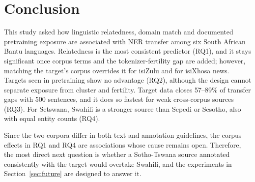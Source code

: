 \section{Conclusion}\label{sec:conclusion}
This study asked how linguistic relatedness, domain match and documented pretraining exposure are associated with NER transfer among six South African Bantu languages. Relatedness is the most consistent predictor (RQ1), and it stays significant once corpus terms and the tokenizer-fertility gap are added; however, matching the target's corpus overrides it for isiZulu and for isiXhosa news. Targets seen in pretraining show no advantage (RQ2), although the design cannot separate exposure from cluster and fertility. Target data closes 57--89\% of transfer gaps with 500 sentences, and it does so fastest for weak cross-corpus sources (RQ3). For Setswana, Swahili is a stronger source than Sepedi or Sesotho, also with equal entity counts (RQ4).

Since the two corpora differ in both text and annotation guidelines, the corpus effects in RQ1 and RQ4 are associations whose cause remains open. Therefore, the most direct next question is whether a Sotho-Tswana source annotated consistently with the target would overtake Swahili, and the experiments in Section~\ref{sec:future} are designed to answer it.

